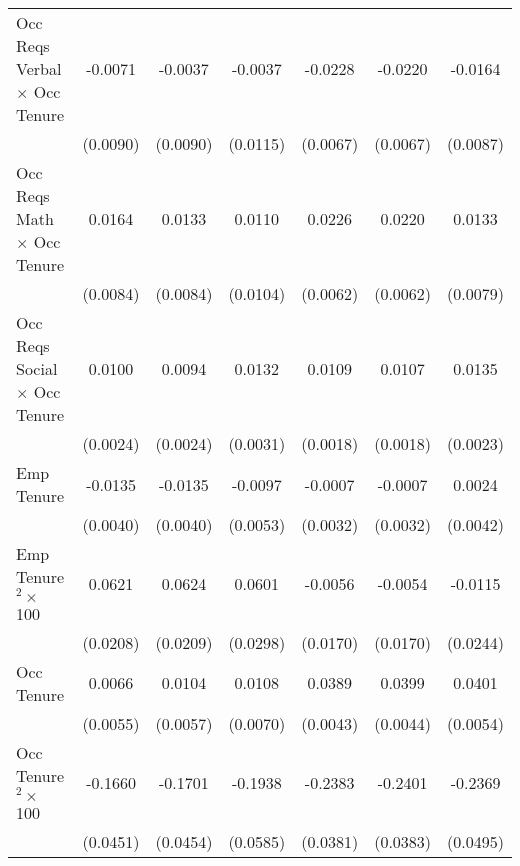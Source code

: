 {\begin{longtable}{l*{6}{c}}
Occ Reqs Verbal $\times$ Occ Tenure&     -0.0071         &     -0.0037         &     -0.0037         &     -0.0228\sym{***}&     -0.0220\sym{***}&     -0.0164\sym{*}  \\
                    &    (0.0090)         &    (0.0090)         &    (0.0115)         &    (0.0067)         &    (0.0067)         &    (0.0087)         \\
Occ Reqs Math $\times$ Occ Tenure&      0.0164\sym{*}  &      0.0133         &      0.0110         &      0.0226\sym{***}&      0.0220\sym{***}&      0.0133\sym{*}  \\
                    &    (0.0084)         &    (0.0084)         &    (0.0104)         &    (0.0062)         &    (0.0062)         &    (0.0079)         \\
Occ Reqs Social $\times$ Occ Tenure&      0.0100\sym{***}&      0.0094\sym{***}&      0.0132\sym{***}&      0.0109\sym{***}&      0.0107\sym{***}&      0.0135\sym{***}\\
                    &    (0.0024)         &    (0.0024)         &    (0.0031)         &    (0.0018)         &    (0.0018)         &    (0.0023)         \\
Emp Tenure          &     -0.0135\sym{***}&     -0.0135\sym{***}&     -0.0097\sym{*}  &     -0.0007         &     -0.0007         &      0.0024         \\
                    &    (0.0040)         &    (0.0040)         &    (0.0053)         &    (0.0032)         &    (0.0032)         &    (0.0042)         \\
Emp Tenure$^2\times$ 100&      0.0621\sym{***}&      0.0624\sym{***}&      0.0601\sym{**} &     -0.0056         &     -0.0054         &     -0.0115         \\
                    &    (0.0208)         &    (0.0209)         &    (0.0298)         &    (0.0170)         &    (0.0170)         &    (0.0244)         \\
Occ Tenure          &      0.0066         &      0.0104\sym{*}  &      0.0108         &      0.0389\sym{***}&      0.0399\sym{***}&      0.0401\sym{***}\\
                    &    (0.0055)         &    (0.0057)         &    (0.0070)         &    (0.0043)         &    (0.0044)         &    (0.0054)         \\
Occ Tenure$^2\times$ 100&     -0.1660\sym{***}&     -0.1701\sym{***}&     -0.1938\sym{***}&     -0.2383\sym{***}&     -0.2401\sym{***}&     -0.2369\sym{***}\\
                    &    (0.0451)         &    (0.0454)         &    (0.0585)         &    (0.0381)         &    (0.0383)         &    (0.0495)         \\

\end{longtable}}
